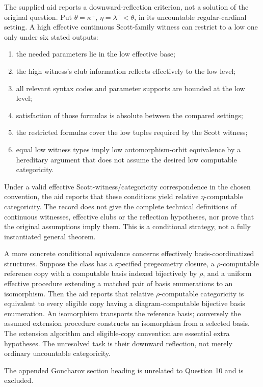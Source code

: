 \documentclass[11pt]{article}
\begin{document}
The supplied aid reports a downward-reflection criterion, not a solution of the original question. Put \(\theta=\kappa^+\), \(\eta=\lambda^+<\theta\), in its uncountable regular-cardinal setting. A high effective continuous Scott-family witness can restrict to a low one only under six stated outputs:
\begin{enumerate}
\item the needed parameters lie in the low effective base;
\item the high witness's club information reflects effectively to the low level;
\item all relevant syntax codes and parameter supports are bounded at the low level;
\item satisfaction of those formulas is absolute between the compared settings;
\item the restricted formulas cover the low tuples required by the Scott witness;
\item equal low witness types imply low automorphism-orbit equivalence by a hereditary argument that does not assume the desired low computable categoricity.
\end{enumerate}
Under a valid effective Scott-witness/categoricity correspondence in the chosen convention, the aid reports that these conditions yield relative \(\eta\)-computable categoricity. The record does not give the complete technical definitions of continuous witnesses, effective clubs or the reflection hypotheses, nor prove that the original assumptions imply them. This is a conditional strategy, not a fully instantiated general theorem.

A more concrete conditional equivalence concerns effectively basis-coordinatized structures. Suppose the class has a specified pregeometry closure, a \(\rho\)-computable reference copy with a computable basis indexed bijectively by \(\rho\), and a uniform effective procedure extending a matched pair of basis enumerations to an isomorphism. Then the aid reports that relative \(\rho\)-computable categoricity is equivalent to every eligible copy having a diagram-computable bijective basis enumeration. An isomorphism transports the reference basis; conversely the assumed extension procedure constructs an isomorphism from a selected basis. The extension algorithm and eligible-copy convention are essential extra hypotheses. The unresolved task is their downward reflection, not merely ordinary uncountable categoricity.

The appended Goncharov section heading is unrelated to Question 10 and is excluded.
\end{document}
